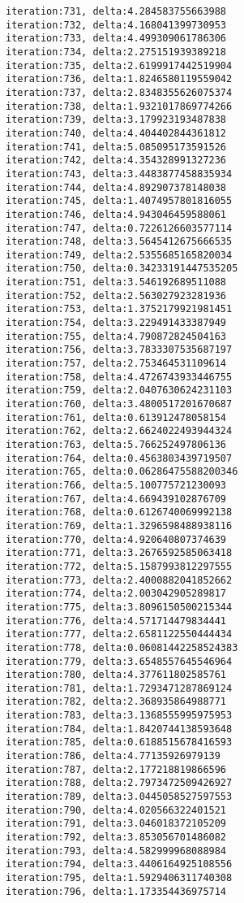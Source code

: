 \documentclass[11pt]{article}
\begin{document}
\begin{Verbatim}[commandchars=\\\{\}]
iteration:731, delta:4.284583755663988
iteration:732, delta:4.168041399730953
iteration:733, delta:4.499309061786306
iteration:734, delta:2.275151939389218
iteration:735, delta:2.6199917442519904
iteration:736, delta:1.8246580119559042
iteration:737, delta:2.8348355626075374
iteration:738, delta:1.9321017869774266
iteration:739, delta:3.179923193487838
iteration:740, delta:4.404402844361812
iteration:741, delta:5.085095173591526
iteration:742, delta:4.354328991327236
iteration:743, delta:3.4483877458835934
iteration:744, delta:4.892907378148038
iteration:745, delta:1.4074957801816055
iteration:746, delta:4.943046459588061
iteration:747, delta:0.7226126603577114
iteration:748, delta:3.5645412675666535
iteration:749, delta:2.5355685165820034
iteration:750, delta:0.34233191447535205
iteration:751, delta:3.546192689511088
iteration:752, delta:2.563027923281936
iteration:753, delta:1.3752179921981451
iteration:754, delta:3.229491433387949
iteration:755, delta:4.790872824504163
iteration:756, delta:3.7833307535687197
iteration:757, delta:2.753464531109614
iteration:758, delta:4.4726743933446755
iteration:759, delta:2.0407630624231103
iteration:760, delta:3.4800517201670687
iteration:761, delta:0.613912478058154
iteration:762, delta:2.6624022493944324
iteration:763, delta:5.766252497806136
iteration:764, delta:0.4563803439719507
iteration:765, delta:0.06286475588200346
iteration:766, delta:5.100775721230093
iteration:767, delta:4.669439102876709
iteration:768, delta:0.6126740069992138
iteration:769, delta:1.3296598488938116
iteration:770, delta:4.920640807374639
iteration:771, delta:3.2676592585063418
iteration:772, delta:5.1587993812297555
iteration:773, delta:2.4000882041852662
iteration:774, delta:2.003042905289817
iteration:775, delta:3.8096150500215344
iteration:776, delta:4.571714479834441
iteration:777, delta:2.6581122550444434
iteration:778, delta:0.06081442258524383
iteration:779, delta:3.6548557645546964
iteration:780, delta:4.377611802585761
iteration:781, delta:1.7293471287869124
iteration:782, delta:2.368935864988771
iteration:783, delta:3.1368555995975953
iteration:784, delta:1.8420744138593648
iteration:785, delta:0.6188515678416593
iteration:786, delta:4.77135926979139
iteration:787, delta:2.177218819866596
iteration:788, delta:2.7973472509426927
iteration:789, delta:3.0445058527597553
iteration:790, delta:4.020566322401521
iteration:791, delta:3.046018372105209
iteration:792, delta:3.853056701486082
iteration:793, delta:4.582999968088984
iteration:794, delta:3.4406164925108556
iteration:795, delta:1.5929406311740308
iteration:796, delta:1.173354436975714

\end{Verbatim}
\end{document}
